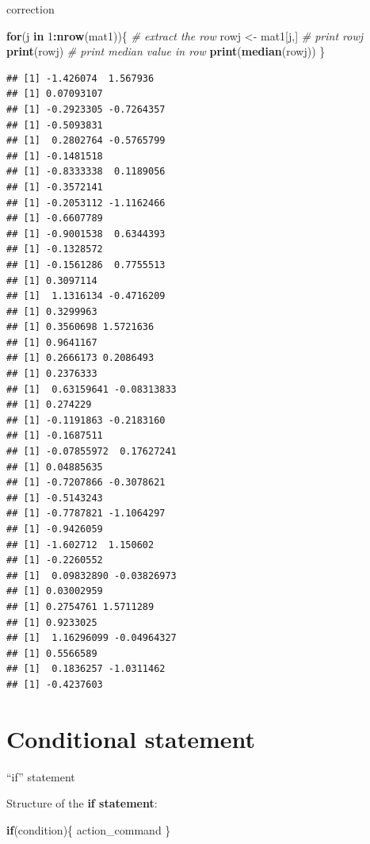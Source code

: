\documentclass[]{book}
\newenvironment{Shaded}{\begin{snugshade}}{\end{snugshade}}
\newcommand{\CommentTok}[1]{\textcolor[rgb]{0.56,0.35,0.01}{\textit{#1}}}
\newcommand{\ControlFlowTok}[1]{\textcolor[rgb]{0.13,0.29,0.53}{\textbf{#1}}}
\newcommand{\DecValTok}[1]{\textcolor[rgb]{0.00,0.00,0.81}{#1}}
\newcommand{\KeywordTok}[1]{\textcolor[rgb]{0.13,0.29,0.53}{\textbf{#1}}}
\newcommand{\NormalTok}[1]{#1}
\newcommand{\OperatorTok}[1]{\textcolor[rgb]{0.81,0.36,0.00}{\textbf{#1}}}
\newcommand{\StringTok}[1]{\textcolor[rgb]{0.31,0.60,0.02}{#1}}
\begin{document}
correction

\begin{Shaded}
\begin{Highlighting}[]
\ControlFlowTok{for}\NormalTok{(j }\ControlFlowTok{in} \DecValTok{1}\OperatorTok{:}\KeywordTok{nrow}\NormalTok{(mat1))\{}
    \CommentTok{# extract the row}
\NormalTok{    rowj <-}\StringTok{ }\NormalTok{mat1[j,]}
    \CommentTok{# print rowj}
    \KeywordTok{print}\NormalTok{(rowj)}
    \CommentTok{# print median value in row}
    \KeywordTok{print}\NormalTok{(}\KeywordTok{median}\NormalTok{(rowj))}
\NormalTok{\}       }
\end{Highlighting}
\end{Shaded}

\begin{verbatim}
## [1] -1.426074  1.567936
## [1] 0.07093107
## [1] -0.2923305 -0.7264357
## [1] -0.5093831
## [1]  0.2802764 -0.5765799
## [1] -0.1481518
## [1] -0.8333338  0.1189056
## [1] -0.3572141
## [1] -0.2053112 -1.1162466
## [1] -0.6607789
## [1] -0.9001538  0.6344393
## [1] -0.1328572
## [1] -0.1561286  0.7755513
## [1] 0.3097114
## [1]  1.1316134 -0.4716209
## [1] 0.3299963
## [1] 0.3560698 1.5721636
## [1] 0.9641167
## [1] 0.2666173 0.2086493
## [1] 0.2376333
## [1]  0.63159641 -0.08313833
## [1] 0.274229
## [1] -0.1191863 -0.2183160
## [1] -0.1687511
## [1] -0.07855972  0.17627241
## [1] 0.04885635
## [1] -0.7207866 -0.3078621
## [1] -0.5143243
## [1] -0.7787821 -1.1064297
## [1] -0.9426059
## [1] -1.602712  1.150602
## [1] -0.2260552
## [1]  0.09832890 -0.03826973
## [1] 0.03002959
## [1] 0.2754761 1.5711289
## [1] 0.9233025
## [1]  1.16296099 -0.04964327
## [1] 0.5566589
## [1]  0.1836257 -1.0311462
## [1] -0.4237603
\end{verbatim}

\hypertarget{conditional-statement}{%
\chapter{Conditional statement}\label{conditional-statement}}

``if'' statement

Structure of the \textbf{if statement}:

\begin{Shaded}
\begin{Highlighting}[]
\ControlFlowTok{if}\NormalTok{(condition)\{}
\NormalTok{    action_command}
\NormalTok{\}}
\end{Highlighting}
\end{Shaded}
\end{document}
